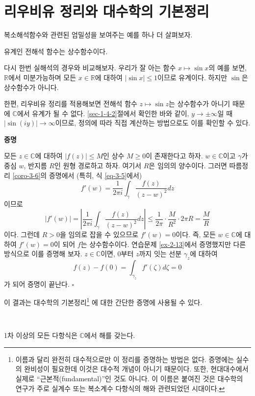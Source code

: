 \section{리우비유 정리와 대수학의 기본정리}

복소해석함수와 관련된 엄밀성을 보여주는 예를 하나 더 살펴보자.

\begin{salttheorem}{}{} \label{thm-3-7}
유계인 전해석 함수는 상수함수이다.
\end{salttheorem}

다시 한번 실해석의 경우와 비교해보자.
우리가 잘 아는 함수 $x\mapsto \sin x$의 예를 보면,
$\mathbb R$에서 미분가능하며
모든 $x\in\mathbb R$에 대하여 $|\sin x|\le 1$이므로 
유계이다.
하지만 $\sin$은 상수함수가 아니다.

한편, 리우비유 정리를 적용해보면
전해석 함수 $z\mapsto \sin z$는 상수함수가 아니기 때문에
$\mathbb C$에서 유계가 될 수 없다.
\ref{sec-1-4-2}절에서 확인한 바와 같이,
$y\to\pm\infty$일 때 $|\sin(iy)| \to \infty$이므로,
정의에 따라 직접 계산하는 방법으로도 이를 확인할 수 있다.

{\bf 증명}

모든 $z\in \mathbb C$에 대하여 $|f(z)|\le M$인
상수 $M\ge0$이 존재한다고 하자.
$w\in\mathbb C$이고 $\gamma$가 중심 $w$, 반지름 $R$인 원형 경로하고 하자. 
여기서 $R$은 임의의 양수이다.
그러면 따름정리 \ref{coro-3-6}의 증명에서 (특히, 식 \eqref{eq-3-5}에서)
\[
f'(w) = \dfrac1{2\pi i} \int_\gamma \dfrac{f(z)}{(z-w)^2}dz
\]
이므로
\[
|f'(w)| = \left| \dfrac1{2\pi i} \int_\gamma \dfrac{f(z)}{(z-w)^2}dz \right|
\le \dfrac1{2\pi}\cdot \dfrac M{R^2}\cdot 2\pi R = \dfrac MR
\]
이다.
그런데 $R>0$을 임의로 잡을 수 있으므로 $f'(w)=0$이다.
즉, 모든 $w\in\mathbb C$에 대하여 $f'(w)=0$이 되어 $f$는 상수함수이다.
연습문제 \ref{ex-2-13}에서 증명했지만 다른 방식으로 이를 증명해 보자.
$z\in\mathbb C$이면, $0$부터 $z$까지 잇는 선분 $\gamma_z$에 대하여
\[
f(z) - f(0) = \int_{\gamma_z} f'(\zeta)d\zeta = 0
\]
가 되어 증명이 끝난다.
\hfill $\square$

이 결과는 대수학의 기본정리\footnote{
이름과 달리 완전히 대수적으로만 이 정리를 증명하는 방법은 없다.
증명에는 실수의 완비성이 필요한데 이것은 대수적 개념이 아니기 때문이다.
또한, 현대대수에서 실제로 ``근본적(fundamental)''인 것도 아니다.
이 이름은 붙여진 것은 대수학의 연구가 주로 실계수 또는 복소계수 다항식의 해와 관련되었던
시대이다.}
에 대한 간단한 증명에 사용될 수 있다.

\begin{salt_corollary}  \label{coro-3-7}
\

1차 이상의 모든 다항식은 $\mathbb C$에서 해를 갖는다.
\end{salt_corollary}

